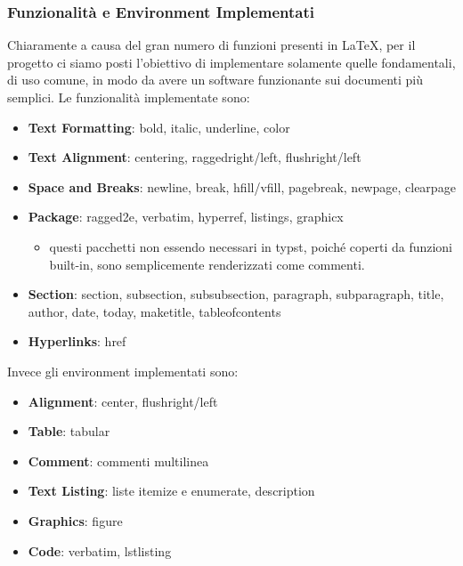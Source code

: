 \documentclass{article}
\begin{document}
    \subsubsection{Funzionalità e Environment Implementati}
    Chiaramente a causa del gran numero di funzioni presenti in LaTeX, per il progetto ci siamo posti l'obiettivo di implementare solamente quelle fondamentali, di uso comune, in modo da avere un software funzionante sui documenti più semplici.
    Le funzionalità implementate sono:
    \begin{itemize}
        \item \textbf{Text Formatting}: bold, italic, underline, color
        \item \textbf{Text Alignment}: centering, raggedright/left, flushright/left
        \item \textbf{Space and Breaks}: newline, break, hfill/vfill, pagebreak, newpage, clearpage
        \item \textbf{Package}: ragged2e, verbatim, hyperref, listings, graphicx \begin{itemize}
                                                                                     \item questi pacchetti non essendo necessari in typst, poiché coperti da funzioni built-in, sono semplicemente renderizzati come commenti.
        \end{itemize}
        \item \textbf{Section}: section, subsection, subsubsection, paragraph, subparagraph, title, author, date, today, maketitle, tableofcontents
        \item \textbf{Hyperlinks}: href
    \end{itemize}
    Invece gli environment implementati sono:
    \begin{itemize}
        \item \textbf{Alignment}: center, flushright/left
        \item \textbf{Table}: tabular
        \item \textbf{Comment}: commenti multilinea
        \item \textbf{Text Listing}: liste itemize e enumerate, description
        \item \textbf{Graphics}: figure
        \item \textbf{Code}: verbatim, lstlisting
    \end{itemize}
\end{document}
